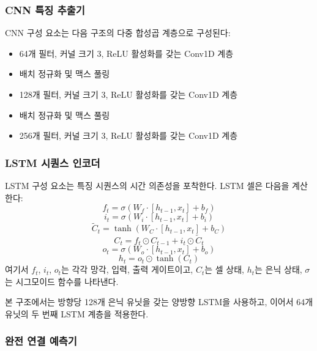 \documentclass[conference,twocolumn]{IEEEtran}
\begin{document}
\subsubsection{CNN 특징 추출기}

CNN 구성 요소는 다음 구조의 다중 합성곱 계층으로 구성된다:
\begin{itemize}
    \item 64개 필터, 커널 크기 3, ReLU 활성화를 갖는 Conv1D 계층
    \item 배치 정규화 및 맥스 풀링
    \item 128개 필터, 커널 크기 3, ReLU 활성화를 갖는 Conv1D 계층
    \item 배치 정규화 및 맥스 풀링
    \item 256개 필터, 커널 크기 3, ReLU 활성화를 갖는 Conv1D 계층
\end{itemize}

\subsubsection{LSTM 시퀀스 인코더}

LSTM 구성 요소는 특징 시퀀스의 시간 의존성을 포착한다. LSTM 셀은 다음을 계산한다:
\begin{equation}
    f_t = \sigma(W_f \cdot [h_{t-1}, x_t] + b_f)
\end{equation}
\begin{equation}
    i_t = \sigma(W_i \cdot [h_{t-1}, x_t] + b_i)
\end{equation}
\begin{equation}
    \tilde{C}_t = \tanh(W_C \cdot [h_{t-1}, x_t] + b_C)
\end{equation}
\begin{equation}
    C_t = f_t \odot C_{t-1} + i_t \odot \tilde{C}_t
\end{equation}
\begin{equation}
    o_t = \sigma(W_o \cdot [h_{t-1}, x_t] + b_o)
\end{equation}
\begin{equation}
    h_t = o_t \odot \tanh(C_t)
\end{equation}
여기서 $f_t$, $i_t$, $o_t$는 각각 망각, 입력, 출력 게이트이고, $C_t$는 셀 상태, $h_t$는 은닉 상태, $\sigma$는 시그모이드 함수를 나타낸다.

본 구조에서는 방향당 128개 은닉 유닛을 갖는 양방향 LSTM을 사용하고, 이어서 64개 유닛의 두 번째 LSTM 계층을 적용한다.

\subsubsection{완전 연결 예측기}
\end{document}
